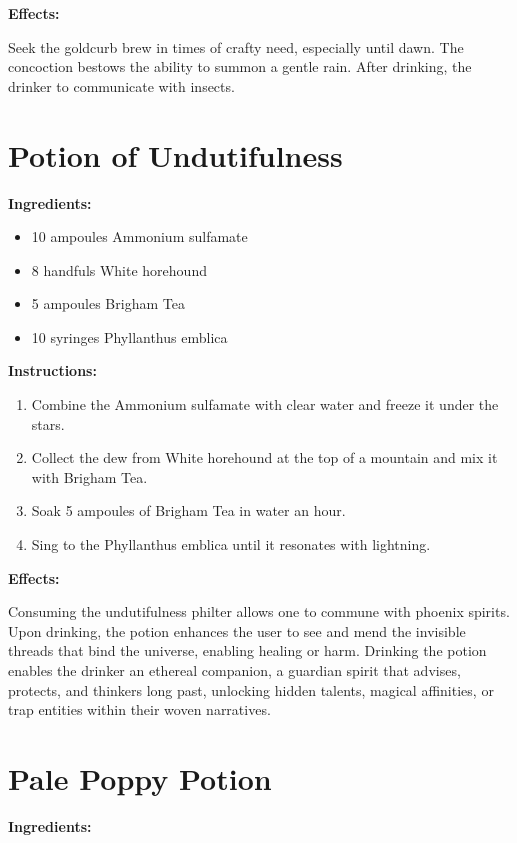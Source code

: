 \documentclass{article}
\begin{document}
\textbf{Effects:}

Seek the goldcurb brew in times of crafty need, especially until dawn. The concoction bestows the ability to summon a gentle rain. After drinking, the drinker to communicate with insects.

\newpage
\section*{Potion of Undutifulness}

\textbf{Ingredients:}

\begin{itemize}
  \item 10 ampoules Ammonium sulfamate
  \item 8 handfuls White horehound
  \item 5 ampoules Brigham Tea
  \item 10 syringes Phyllanthus emblica
\end{itemize}

\textbf{Instructions:}

\begin{enumerate}
  \item Combine the Ammonium sulfamate with clear water and freeze it under the stars.
  \item Collect the dew from White horehound at the top of a mountain and mix it with Brigham Tea.
  \item Soak 5 ampoules of Brigham Tea in water an hour.
  \item Sing to the Phyllanthus emblica until it resonates with lightning.
\end{enumerate}

\textbf{Effects:}

Consuming the undutifulness philter allows one to commune with phoenix spirits. Upon drinking, the potion enhances the user to see and mend the invisible threads that bind the universe, enabling healing or harm. Drinking the potion enables the drinker an ethereal companion, a guardian spirit that advises, protects, and thinkers long past, unlocking hidden talents, magical affinities, or trap entities within their woven narratives.

\newpage
\section*{Pale Poppy Potion}

\textbf{Ingredients:}
\end{document}
